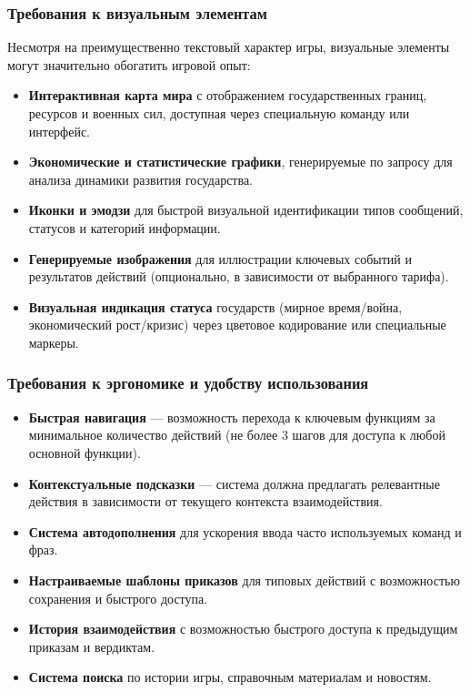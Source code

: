 \subsubsection{Требования к визуальным элементам}

Несмотря на преимущественно текстовый характер игры, визуальные элементы могут значительно обогатить игровой опыт:

\begin{itemize}
    \item \textbf{Интерактивная карта мира} с отображением государственных границ, ресурсов и военных сил, доступная через специальную команду или интерфейс.

    \item \textbf{Экономические и статистические графики}, генерируемые по запросу для анализа динамики развития государства.

    \item \textbf{Иконки и эмодзи} для быстрой визуальной идентификации типов сообщений, статусов и категорий информации.

    \item \textbf{Генерируемые изображения} для иллюстрации ключевых событий и результатов действий (опционально, в зависимости от выбранного тарифа).

    \item \textbf{Визуальная индикация статуса} государств (мирное время/война, экономический рост/кризис) через цветовое кодирование или специальные маркеры.
\end{itemize}

\subsubsection{Требования к эргономике и удобству использования}

\begin{itemize}
    \item \textbf{Быстрая навигация} — возможность перехода к ключевым функциям за минимальное количество действий (не более 3 шагов для доступа к любой основной функции).

    \item \textbf{Контекстуальные подсказки} — система должна предлагать релевантные действия в зависимости от текущего контекста взаимодействия.

    \item \textbf{Система автодополнения} для ускорения ввода часто используемых команд и фраз.

    \item \textbf{Настраиваемые шаблоны приказов} для типовых действий с возможностью сохранения и быстрого доступа.

    \item \textbf{История взаимодействия} с возможностью быстрого доступа к предыдущим приказам и вердиктам.

    \item \textbf{Система поиска} по истории игры, справочным материалам и новостям.
\end{itemize}

